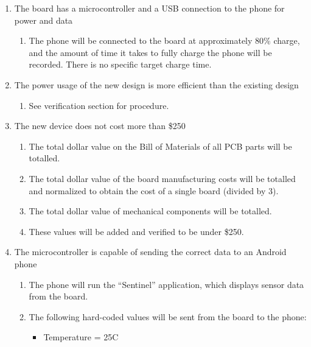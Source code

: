 \documentclass{article}
\numberwithin{figure}{section}
\numberwithin{equation}{section}
\begin{document}
{\begin{enumerate}[align=left,leftmargin=*, labelindent= 0em, label=\textbf{\CheckBox{} Item \thesubsubsection.\arabic*.}, itemindent=0em]
    \item \label{val1}The board has a microcontroller and a USB connection to the phone for power and data
        \begin{enumerate}[label=\CheckBox{}]
            \item The phone will be connected to the board at approximately 80\% charge, and the amount of time it takes to fully charge the phone will be recorded. There is no specific target charge time.
        \end{enumerate}
    \item \label{val2}The power usage of the new design is more efficient than the existing design
        \begin{enumerate}[label=\CheckBox{}]
            \item See verification section for procedure.
        \end{enumerate}
    \item \label{val3}The new device does not cost more than \$250
        \begin{enumerate}[label=\CheckBox{}]
            \item The total dollar value on the Bill of Materials of all PCB parts will be totalled.
            \item The total dollar value of the board manufacturing costs will be totalled and normalized to obtain the cost of a single board (divided by 3).
            \item The total dollar value of mechanical components will be totalled.
            \item These values will be added and verified to be under \$250. 
        \end{enumerate}
    \item \label{val4}The microcontroller is capable of sending the correct data to an Android phone
        \begin{enumerate}[label=\CheckBox{}]
            \item The phone will run the ``Sentinel'' application, which displays sensor data from the board.
            \item The following hard-coded values will be sent from the board to the phone:
                \begin{itemize}
                    \item Temperature = 25C

\end{itemize}
\end{enumerate}
\end{enumerate}}
\end{document}
